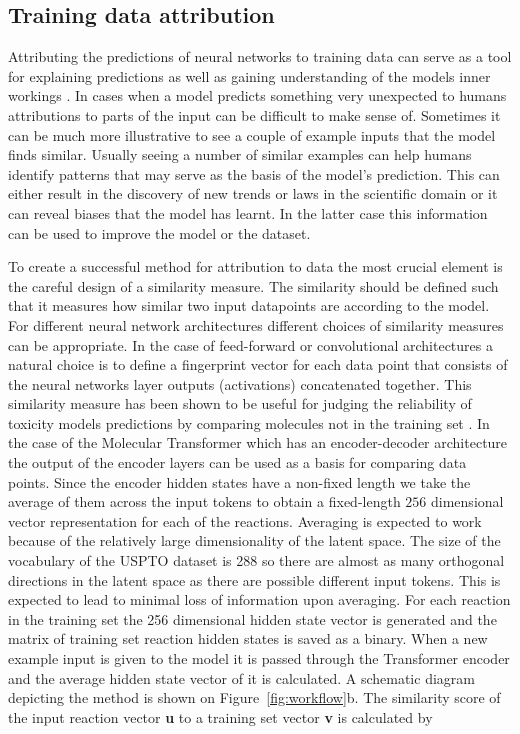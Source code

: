 \subsection*{Training data attribution}
Attributing the predictions of neural networks to training data can serve as a tool for explaining predictions as well as gaining understanding of the models inner workings \cite{tetko2002}. In cases when a model predicts something very unexpected to humans attributions to parts of the input can be difficult to make sense of. Sometimes it can be much more illustrative to see a couple of example inputs that the model finds similar. Usually seeing a number of similar examples can help humans identify patterns that may serve as the basis of the model's prediction. This can either result in the discovery of new trends or laws in the scientific domain or it can reveal biases that the model has learnt. In the latter case this information can be used to improve the model or the dataset.

To create a successful method for attribution to data the most crucial element is the careful design of a similarity measure. The similarity should be defined such that it measures how similar two input datapoints are according to the model. For different neural network architectures different choices of similarity measures can be appropriate. In the case of feed-forward or convolutional architectures a natural choice is to define a fingerprint vector for each data point that consists of the neural networks layer outputs (activations) concatenated together. This similarity measure has been shown to be useful for judging the reliability of toxicity models predictions by comparing molecules not in the training set \cite{Allen2020}. In the case of the Molecular Transformer which has an encoder-decoder architecture the output of the encoder layers can be used as a basis for comparing data points. Since the encoder hidden states have a non-fixed length we take the average of them across the input tokens to obtain a fixed-length $256$ dimensional vector representation for each of the reactions. Averaging is expected to work because of the relatively large dimensionality of the latent space. The size of the vocabulary of the USPTO dataset is 288 so there are almost as many orthogonal directions in the latent space as there are possible different input tokens. This is expected to lead to minimal loss of information upon averaging. For each reaction in the training set the 256 dimensional hidden state vector is generated and the matrix of training set reaction hidden states is saved as a binary. When a new example input is given to the model it is passed through the Transformer encoder and the average hidden state vector of it is calculated. A schematic diagram depicting the method is shown on Figure~\ref{fig:workflow}b. The similarity score of the input reaction vector \textbf{u} to a training set vector \textbf{v} is calculated by

